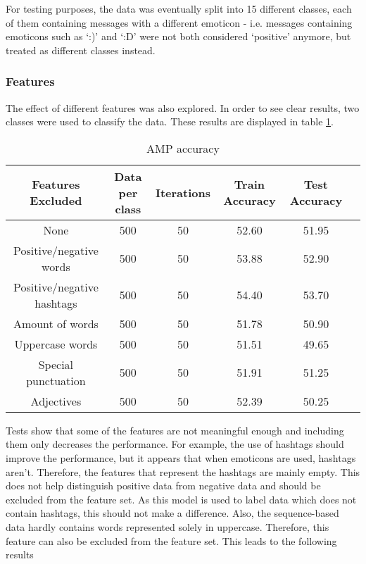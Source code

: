 \noindent For testing purposes, the data was eventually split into 15 different classes, each of them containing messages with a different emoticon - i.e. messages containing emoticons such as `:)' and `:D' were not both considered `positive' anymore, but treated as different classes instead.


\subsubsection*{Features}

The effect of different features was also explored. In order to see clear results, two classes were used to classify the data. These results are displayed in table \ref{table:AMPfeatures}.

\begin{table}[h!]
\begin{center}
\begin{tabular}{| c | c | c | c | c | c |}
\hline
 {\textbf{Features Excluded}} 	 
 & {\textbf{Data per class}} 					& {\textbf{Iterations}} 
 & {\textbf{Train Accuracy}} 					& {\textbf{Test Accuracy}} 
 \\
\hline
None		&				500	&	50	&	52.60	& 	51.95	\\
Positive/negative words	&		500	&	50	&	53.88	&	52.90	\\
Positive/negative hashtags	&	500	&	50	&	54.40	&	53.70	\\
Amount of words	&		500	&	50	&	51.78	&	50.90	\\
Uppercase words	&		500	&	50	&	51.51	&	49.65	\\
Special punctuation	&	500	&	50	&	51.91	&	51.25	\\
Adjectives	&			500	&	50	&	52.39	&	50.25	\\
\hline
\end{tabular}
\caption{AMP accuracy}
\label{table:AMPfeatures}
\end{center}
\end{table}


Tests show that some of the features are not meaningful enough and including them only decreases the performance. For example, the use of hashtags should improve the performance, but it appears that when emoticons are used, hashtags aren't. Therefore, the features that represent the hashtags are mainly empty. This does not help distinguish positive data from negative data and should be excluded from the feature set. As this model is used to label data which does not contain hashtags, this should not make a difference. Also, the sequence-based data hardly contains words represented solely in uppercase. Therefore, this feature can also be excluded from the feature set. This leads to the following results

